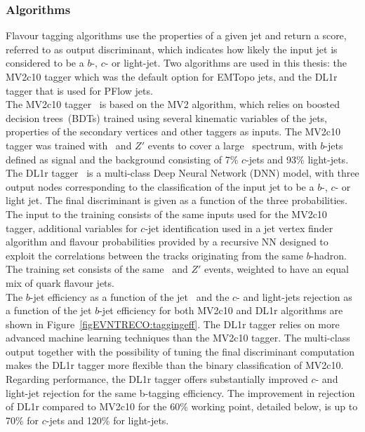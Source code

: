 \subsubsection{Algorithms}

Flavour tagging algorithms use the properties of a given jet and return a score, referred to as output discriminant, which indicates how likely the input jet is considered to be a $b$-, $c$- or light-jet. Two algorithms are used in this thesis: the MV2c10 tagger which was the default option for EMTopo jets, and the DL1r tagger that is used for PFlow jets.\\

The MV2c10 tagger~\cite{ATL-PHYS-PUB-2015-022} is based on the MV2 algorithm, which relies on boosted decision trees~(BDTs) trained using several kinematic variables of the jets, properties of the secondary vertices and other taggers as inputs. The MV2c10 tagger was trained with \ttbar\ and $Z'$ events to cover a large \pT\ spectrum, with $b$-jets defined as signal and the background consisting of 7\% $c$-jets and 93\% light-jets.\\

The DL1r tagger~\cite{taggingeff} is a multi-class Deep Neural Network (DNN) model, with three output nodes corresponding to the classification of the input jet to be a $b$-, $c$- or light jet. The final discriminant is given as a function of the three probabilities. The input to the training consists of the same inputs used for the MV2c10 tagger, additional variables for $c$-jet identification used in a jet vertex finder algorithm and flavour probabilities provided by a recursive NN designed to exploit the correlations between the tracks originating from the same $b$-hadron. The training set consists of the same \ttbar\ and $Z'$ events, weighted to have an equal mix of quark flavour jets.\\

The $b$-jet efficiency as a function of the jet \pT\ and the $c$- and light-jets rejection as a function of the jet $b$-jet efficiency for both MV2c10 and DL1r algorithms are shown in Figure~\ref{figEVNTRECO:taggingeff}. The DL1r tagger relies on more advanced machine learning techniques than the MV2c10 tagger. The multi-class output together with the possibility of tuning the final discriminant computation makes the DL1r tagger more flexible than the binary classification of MV2c10. Regarding performance, the DL1r tagger offers substantially improved $c$- and light-jet rejection for the same b-tagging efficiency. The improvement in rejection of DL1r compared to MV2c10 for the 60\% working point, detailed below, is up to 70\% for $c$-jets and 120\% for light-jets.

